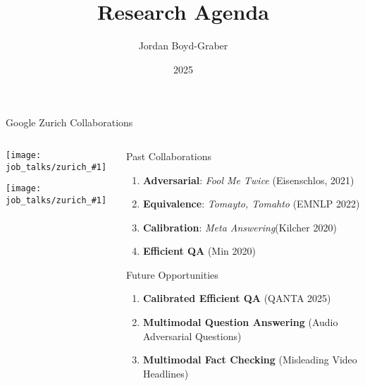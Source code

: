\documentclass[compress]{beamer}
\title[]{Research Agenda}
\author{ Jordan Boyd-Graber}
\date{2025}
\institute[] %
{University of Maryland}
\newcommand{\gfxz}[2]{
	\begin{center}
		\texttt{[image: job\_talks/zurich\_\#1]}
	\end{center}
}
\begin{document}
\frame{
\titlepage
\tiny
}

\begin{frame}{Google Zurich Collaborations}
\begin{columns}
  \begin{column}{0.25\textwidth}
    \gfxz{massi}{1.0}
    \gfxz{jannis}{1.0}
  \end{column}
  \begin{column}{0.8\textwidth}
    \begin{block}{Past Collaborations}
      \begin{enumerate}
        \item \textbf{Adversarial}:  
        \textit{Fool Me Twice} (Eisenschlos, 2021)

        \item \textbf{Equivalence}:  
        \textit{Tomayto, Tomahto} (EMNLP 2022)

        \item \textbf{Calibration}:  
          \textit{Meta Answering}(Kilcher 2020)


          \item \textbf{Efficient QA} (Min 2020)
      \end{enumerate}
    \end{block}

    \begin{block}{Future Opportunities}
      \begin{enumerate}
        \item \textbf{Calibrated Efficient QA}  (QANTA 2025)
        \item \textbf{Multimodal Question Answering} (Audio Adversarial Questions)
        \item \textbf{Multimodal Fact Checking} (Misleading Video Headlines)
      \end{enumerate}
    \end{block}
  \end{column}
\end{columns}
\end{frame}
\end{document}
